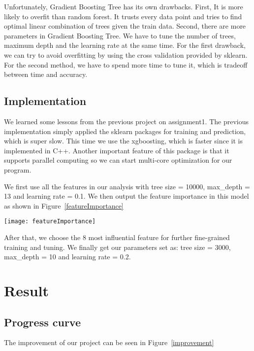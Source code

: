\documentclass[jou,apacite]{apa6}
\begin{document}
Unfortunately, Gradient Boosting Tree has its own drawbacks. First, It is more likely to overfit than random forest. It trusts every data point and tries to find optimal linear combination of trees given the train data. Second, there are more parameters in Gradient Boosting Tree. We have to tune the number of trees, maximum depth and the learning rate at the same time. For the first drawback, we can try to avoid overfitting by using the cross validation provided by sklearn. For the second method, we have to spend more time to tune it, which is tradeoff between time and accuracy.

\subsection{Implementation}

We learned some lessons from the previous project on assignment1. The previous implementation simply applied the sklearn packages for training and prediction, which is super slow. This time we use the xgboosting, which is faster since it is implemented in C++. Another important feature of this package is that it supports parallel computing so we can start multi-core optimization for our program.

We first use all the features in our analysis with tree size = 10000, max\_depth = 13 and learning rate = 0.1. We then output the feature importance in this model as shown in Figure~\ref{featureImportance}
    
    \begin{figure*}
    \begin{center}
    \texttt{[image: featureImportance]}
    \makeatletter\def\@captype{figure}\makeatother
    \caption{\centering feature importance}
    \label{featureImportance}
    \end{center}  
    \end{figure*}
    
    
After that, we choose the 8 most influential feature for further fine-grained training and tuning. We finally get our parameters set as: tree size = 3000, max\_depth = 10 and learning rate = 0.2.



\section{Result}

\subsection{Progress curve}
The improvement of our project can be seen in Figure~\ref{improvement}
    
\end{document}
